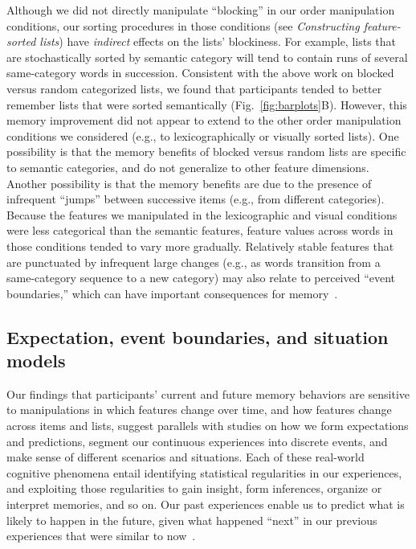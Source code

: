 \documentclass[11pt]{article}
\begin{document}
Although we did not directly manipulate ``blocking'' in our order manipulation
conditions, our sorting procedures in those conditions (see
\textit{Constructing feature-sorted lists}) have \textit{indirect} effects on
the lists' blockiness. For example, lists that are stochastically sorted by
semantic category will tend to contain runs of several same-category words in
succession. Consistent with the above work on blocked versus random categorized
lists, we found that participants tended to better remember lists that were
sorted semantically (Fig.~\ref{fig:barplots}B). However, this memory
improvement did not appear to extend to the other order manipulation conditions
we considered (e.g., to lexicographically or visually sorted lists). One
possibility is that the memory benefits of blocked versus random lists are
specific to semantic categories, and do not generalize to other feature
dimensions. Another possibility is that the memory benefits are due to the
presence of infrequent ``jumps'' between successive items (e.g., from different
categories). Because the features we manipulated in the lexicographic and
visual conditions were less categorical than the semantic features, feature
values across words in those conditions tended to vary more gradually.
Relatively stable features that are punctuated by infrequent large changes
(e.g., as words transition from a same-category sequence to a new category) may
also relate to perceived ``event boundaries,'' which can have important
consequences for memory~\citep{RadvZack17, DuBrEtal17, DuBrDava16, DuBrDava13}.


\subsection*{Expectation, event boundaries, and situation models}

Our findings that participants' current and future memory behaviors are
sensitive to manipulations in which features change over time, and how features
change across items and lists, suggest parallels with studies on how we form
expectations and predictions, segment our continuous experiences into discrete
events, and make sense of different scenarios and situations. Each of these
real-world cognitive phenomena entail identifying statistical regularities in
our experiences, and exploiting those regularities to gain insight, form
inferences, organize or interpret memories, and so on. Our past experiences
enable us to predict what is likely to happen in the future, given what
happened ``next'' in our previous experiences that were similar to
now~\citep{Mann20, EichFort09, BarrEtal20, Brig12, ChowEtal16, GlucEtal02,
GoldEtal21, GrifStey03, JonePash07, KimEtal14, TamiThor18, XuEtal23}.
\end{document}

